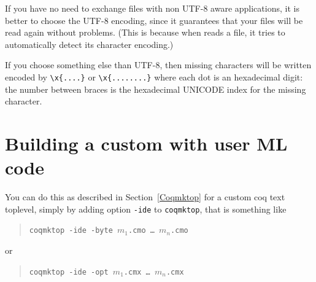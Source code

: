 If you have no need to exchange files with non UTF-8 aware
applications, it is better to choose the UTF-8 encoding, since it
guarantees that your files will be read again without problems. (This
is because when \CoqIDE{} reads a file, it tries to automatically
detect its character encoding.) 

If you choose something else than UTF-8, then missing characters will
be written encoded by \verb|\x{....}| or \verb|\x{........}| where
each dot is an hexadecimal digit: the number between braces is the
hexadecimal UNICODE index for the missing character.


\section{Building a custom \CoqIDE{} with user \textsc{ML} code}

You can do this as described in Section~\ref{Coqmktop} for a
custom coq text toplevel, simply by adding 
option \verb|-ide| to \verb|coqmktop|, that is something like
\begin{quote}
\texttt{coqmktop -ide -byte $m_1$.cmo \ldots{} $m_n$.cmo}
\end{quote}
or 
\begin{quote}
\texttt{coqmktop -ide -opt $m_1$.cmx \ldots{} $m_n$.cmx}
\end{quote}

    


